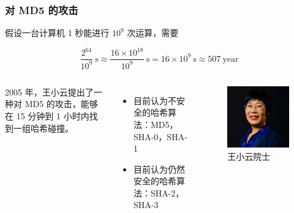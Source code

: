 \documentclass{beamer}
\begin{document}
\begin{frame}
    \frametitle{对 MD5 的攻击}

    假设一台计算机 1 秒能进行 $10^9$ 次运算，需要

    \[\frac{2^{64}}{10^9} \ \text{s} \approx \frac{16\times 10^{18}}{10^9} \ \text{s} = 16 \times 10^9 \ \text{s} \approx 507 \ \text{year}\]

    \begin{columns}

        2005 年，王小云提出了一种对 MD5 的攻击，能够在 15 分钟到 1 小时内找到一组哈希碰撞。

        \vline

        \begin{itemize}
            \item 目前认为不安全的哈希算法：MD5，SHA-0，SHA-1
            \item 目前认为仍然安全的哈希算法：SHA-2，SHA-3
        \end{itemize}


        \begin{figure}
            \centering
            \includegraphics[width=\textwidth]{res/xiaoyunwang.jpg}
            \caption{王小云院士}
        \end{figure}
    \end{columns}

\end{frame}
\end{document}
